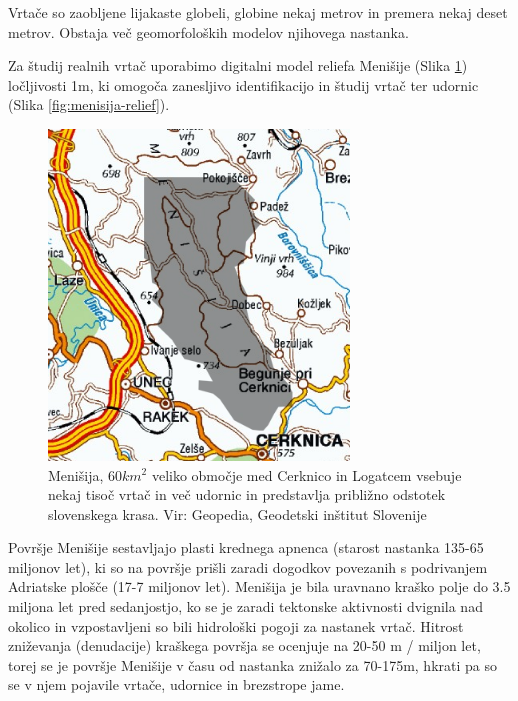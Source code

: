 \documentclass[a4paper, oneside, 12pt]{book}
\begin{document}
        Vrtače so zaobljene lijakaste globeli, globine nekaj metrov in premera nekaj deset metrov. Obstaja več geomorfoloških modelov njihovega nastanka.

        Za študij realnih vrtač uporabimo digitalni model reliefa Menišije (Slika \ref{fig:menisija-karta}) ločljivosti 1m, ki omogoča zanesljivo identifikacijo in študij vrtač ter udornic (Slika \ref{fig:menisija-relief}).

        \begin{figure}[H]
          \centering
          \includegraphics[width=8cm]{slike/menisija-karta}
          \caption{Menišija, $60 km^2$ veliko območje med Cerknico in Logatcem vsebuje nekaj tisoč vrtač in več udornic in predstavlja približno odstotek slovenskega krasa. Vir: Geopedia, Geodetski inštitut Slovenije}
          \label{fig:menisija-karta}
        \end{figure}

        Površje Menišije sestavljajo plasti krednega apnenca (starost nastanka 135-65 miljonov let), ki so na površje prišli zaradi dogodkov povezanih s podrivanjem Adriatske plošče (17-7 miljonov let). Menišija je bila uravnano kraško polje do 3.5 miljona let pred sedanjostjo, ko se je zaradi tektonske aktivnosti dvignila nad okolico in vzpostavljeni so bili hidrološki pogoji za nastanek vrtač. Hitrost zniževanja (denudacije) kraškega površja se ocenjuje na 20-50 m / miljon let, torej se je površje Menišije v času od nastanka znižalo za 70-175m, hkrati pa so se v njem pojavile vrtače, udornice in brezstrope jame. \cite{Vrabec2006} \cite{Placer2010}
\end{document}
